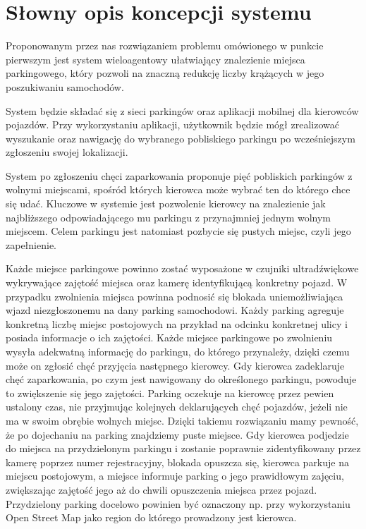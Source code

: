 \newpage
\section{Słowny opis koncepcji systemu}

Proponowanym przez nas rozwiązaniem problemu omówionego w punkcie pierwszym jest system wieloagentowy ułatwiający znalezienie miejsca parkingowego, który pozwoli na znaczną redukcję liczby krążących w jego poszukiwaniu samochodów.

System będzie składać się z sieci parkingów oraz aplikacji mobilnej dla kierowców pojazdów. Przy wykorzystaniu aplikacji, użytkownik będzie mógł zrealizować wyszukanie oraz nawigację do wybranego pobliskiego parkingu po wcześniejszym zgłoszeniu swojej lokalizacji. 

System po zgłoszeniu chęci zaparkowania proponuje pięć pobliskich parkingów z wolnymi miejscami, spośród których kierowca może wybrać ten do którego chce się udać. Kluczowe w systemie jest pozwolenie kierowcy na znalezienie jak najbliższego odpowiadającego mu parkingu z przynajmniej jednym wolnym miejscem. Celem parkingu jest natomiast pozbycie się pustych miejsc, czyli jego zapełnienie.

Każde miejsce parkingowe powinno zostać wyposażone w czujniki ultradźwiękowe wykrywające zajętość miejsca oraz kamerę identyfikującą konkretny pojazd. W przypadku zwolnienia miejsca powinna podnosić się blokada uniemożliwiająca wjazd niezgłoszonemu na dany parking samochodowi. Każdy parking agreguje konkretną liczbę miejsc postojowych na przykład na odcinku konkretnej ulicy i posiada informacje o ich zajętości. Każde miejsce parkingowe po zwolnieniu wysyła adekwatną informację do parkingu, do którego przynależy, dzięki czemu może on zgłosić chęć przyjęcia następnego kierowcy. Gdy kierowca zadeklaruje chęć zaparkowania, po czym jest nawigowany do określonego parkingu, powoduje to zwiększenie się jego zajętości. Parking oczekuje na kierowcę przez pewien ustalony czas, nie przyjmując kolejnych deklarujących chęć pojazdów, jeżeli nie ma w swoim obrębie wolnych miejsc. Dzięki takiemu rozwiązaniu mamy pewność, że po dojechaniu na parking znajdziemy puste miejsce. Gdy kierowca podjedzie do miejsca na przydzielonym parkingu i zostanie poprawnie zidentyfikowany przez kamerę poprzez numer rejestracyjny, blokada opuszcza się, kierowca parkuje na miejscu postojowym, a miejsce informuje parking o jego prawidłowym zajęciu, zwiększając zajętość jego aż do chwili opuszczenia miejsca przez pojazd. Przydzielony parking docelowo powinien być oznaczony np. przy wykorzystaniu Open Street Map jako region do którego prowadzony jest kierowca. 

